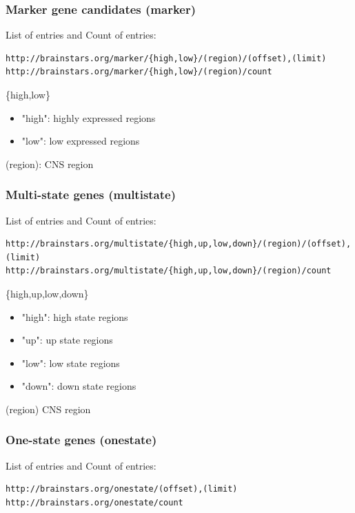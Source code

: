 \documentclass[12pt,fullpage]{article}
\begin{document}
\subsubsection{Marker gene candidates (marker)}
List of entries and Count of entries: 
\begin{verbatim}
http://brainstars.org/marker/{high,low}/(region)/(offset),(limit) 
http://brainstars.org/marker/{high,low}/(region)/count 
\end{verbatim}

\begin{description}
  \item{\{high,low\}}
    \begin{itemize}
      \item "high": highly expressed regions
      \item "low": low expressed regions
    \end{itemize}        
  \item (region): CNS region
\end{description}    

\subsubsection{Multi-state genes (multistate)}
List of entries and Count of entries: 
\begin{verbatim}
http://brainstars.org/multistate/{high,up,low,down}/(region)/(offset),(limit) 
http://brainstars.org/multistate/{high,up,low,down}/(region)/count 
\end{verbatim}

\begin{description}
  \item{\{high,up,low,down\}}
    \begin{itemize}
      \item "high": high state regions
      \item "up": up state regions
      \item "low": low state regions
      \item "down": down state regions
    \end{itemize}
  \item{(region)} CNS region
\end{description}    

\subsubsection{One-state genes (onestate)}
List of entries and Count of entries: 
\begin{verbatim}
http://brainstars.org/onestate/(offset),(limit) 
http://brainstars.org/onestate/count
\end{verbatim}
\end{document}
